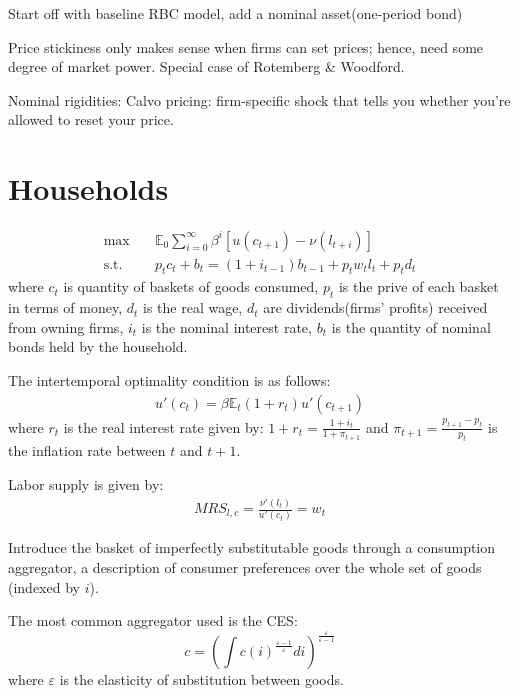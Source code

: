 Start off with baseline RBC model, add a nominal asset(one-period bond)

Price stickiness only makes sense when ﬁrms can set prices;
hence, need some degree of market power. Special case of
Rotemberg \& Woodford.

Nominal rigidities: Calvo pricing: ﬁrm-speciﬁc shock that tells
you whether you're allowed to reset your price.

\section{Households}
\begin{align*}
    \max &\quad \mathbb{E}_0 \sum_{i=0}^\infty \beta^i \left[ u(c_{t+1}) - \nu(l_{t+i} ) \right] \\
    \text{s.t.} &\quad p_tc_t + b_t = (1+i_{t-1})b_{t-1} + p_t w_t l_t + p_t d_t
\end{align*}
where $c_t$ is quantity of baskets of goods consumed, $p_t$ is the prive of each basket in terms of money,
$d_t$ is the real wage, $d_t$ are dividends(firms' profits) received from owning firms,
$i_t$ is the nominal interest rate, $b_t$ is the quantity of nominal bonds held by the household.

The intertemporal optimality condition is as follows:
\begin{align*}
    u'(c_t) = \beta \mathbb{E}_t(1+r_t)u'(c_{t+1})
\end{align*}
where $r_t$ is the real interest rate given by: $1 + r_t = \frac{1+i_t}{1+\pi_{t+1} }$
and $\pi_{t+1} = \frac{p_{t+1}-p_t}{p_t}$ is the inflation rate between $t$ and $t+1$.

Labor supply is given by:
\begin{align*}
    MRS_{l,c} = \frac{\nu'(l_t)}{u'(c_t)} = w_t
\end{align*}

Introduce the basket of imperfectly substitutable goods
through a consumption aggregator, a description of consumer
preferences over the whole set of goods (indexed by $i$).

The most common aggregator used is the CES:
\[ 
c = \left(\int c(i)^{\frac{\varepsilon-1}{\varepsilon}} di\right)^{\frac{\varepsilon}{\varepsilon-1}}
\]
where $\varepsilon$ is the elasticity of substitution between goods.

